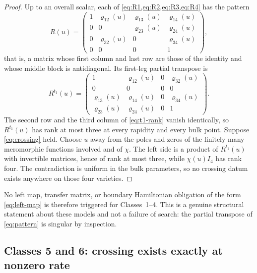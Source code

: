 \documentclass[11pt,reqno]{amsart}
\theoremstyle{plain}
\theoremstyle{definition}
\theoremstyle{remark}
\numberwithin{equation}{section}
\begin{document}
\begin{proof}
Up to an overall scalar, each of \cref{eq:R1,eq:R2,eq:R3,eq:R4} has the pattern
\begin{equation}
R(u)=\begin{pmatrix}
1&\varrho_{12}(u)&\varrho_{13}(u)&\varrho_{14}(u)\\
0&0&\varrho_{23}(u)&\varrho_{24}(u)\\
0&\varrho_{32}(u)&0&\varrho_{34}(u)\\
0&0&0&1
\end{pmatrix},
\label{eq:pattern}
\end{equation}
that is, a matrix whose first column and last row are those of the identity and
whose middle block is antidiagonal. Its first-leg partial transpose is
\begin{equation}
R^{t_1}(u)=\begin{pmatrix}
1&\varrho_{12}(u)&0&\varrho_{32}(u)\\
0&0&0&0\\
\varrho_{13}(u)&\varrho_{14}(u)&0&\varrho_{34}(u)\\
\varrho_{23}(u)&\varrho_{24}(u)&0&1
\end{pmatrix}.                                      \label{eq:t1-rank}
\end{equation}
The second row and the third column of \cref{eq:t1-rank} vanish identically, so
$R^{t_1}(u)$ has rank at most three at every rapidity and every bulk point.
Suppose \cref{eq:crossing} held. Choose $u$ away from the poles and zeros of the
finitely many meromorphic functions involved and of $\chi$. The left side is a
product of $R^{t_1}(u)$ with invertible matrices, hence of rank at most three,
while $\chi(u)I_4$ has rank four. The contradiction is uniform in the bulk
parameters, so no crossing datum exists anywhere on those four varieties.
\end{proof}

No left map, transfer matrix, or boundary Hamiltonian obligation of the form
\cref{eq:left-map} is therefore triggered for Classes~1--4. This is a genuine
structural statement about these models and not a failure of search: the
partial transpose of \cref{eq:pattern} is singular by inspection.

\subsection{Classes 5 and 6: crossing exists exactly at nonzero rate}
\end{document}

